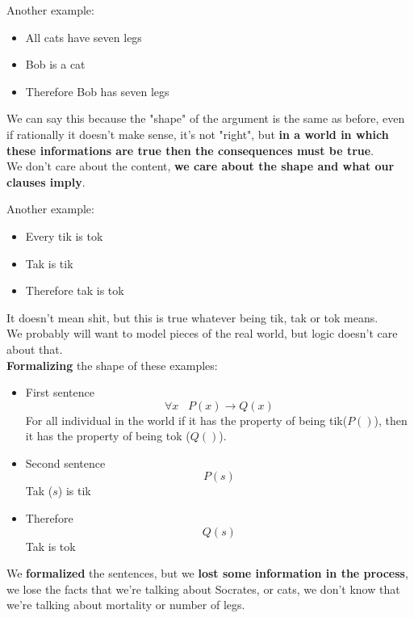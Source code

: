 \documentclass[11pt]{article}
\begin{document}
	Another example: 
	\begin{itemize}
		\item All cats have seven legs 
		\item Bob is a cat 
		\\ \bline
		\item Therefore Bob has seven legs
	\end{itemize}
	 
	We can say this because the "shape" of the argument is the same as before, even if rationally it doesn't make sense, it's not "right", but \textbf{in a world in which these informations are true then the consequences must be true}.\\
	
	We don't care about the content, \textbf{we care about the shape and what our clauses imply}.  \\
	
	\newpage
	
	Another example: 
	\begin{itemize}
		\item Every tik is tok
		\item Tak is tik 
		\\ \bline
		\item Therefore tak is tok
	\end{itemize}
	
	It doesn't mean shit, but this is true whatever being tik, tak or tok means. \\
	
	We probably will want to model pieces of the real world, but logic doesn't care about that. \\
	
	\textbf{Formalizing} the shape of these examples:
	\begin{itemize}
		\item First sentence
		$$ \forall x \;\;\;  P(x) \rightarrow Q(x) $$
		For all individual in the world if it has the property of being tik($P()$), then it has the property of being tok ($Q()$).
		
		\item Second sentence 
		$$ P(s) $$
		Tak ($s$) is tik 
		\\ \bline
		
		\item Therefore 
		$$ Q(s) $$
		Tak is tok
	\end{itemize}
	
	We \textbf{formalized} the sentences, but we \textbf{lost some information in the process}, we lose the facts that we're talking about Socrates, or cats, we don't know that we're talking about mortality or number of legs. \\
	
\end{document}
